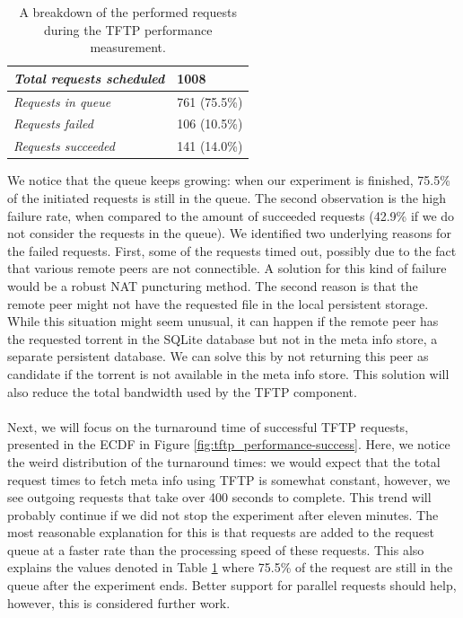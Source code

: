 \begin{table}[h!]
	\centering
	\begin{tabular}{|l|l|}
		\hline
		\emph{Total requests scheduled} & 1008 \\ \hline
		\emph{Requests in queue} & 761 (75.5\%)\\ \hline
		\emph{Requests failed} & 106 (10.5\%)\\ \hline
		\emph{Requests succeeded} & 141 (14.0\%)\\ \hline
	\end{tabular}
	\caption{A breakdown of the performed requests during the TFTP performance measurement.}
	\label{table:tftp-performance}
\end{table}

We notice that the queue keeps growing: when our experiment is finished, 75.5\% of the initiated requests is still in the queue. The second observation is the high failure rate, when compared to the amount of succeeded requests (42.9\% if we do not consider the requests in the queue). We identified two underlying reasons for the failed requests. First, some of the requests timed out, possibly due to the fact that various remote peers are not connectible. A solution for this kind of failure would be a robust NAT puncturing method. The second reason is that the remote peer might not have the requested file in the local persistent storage. While this situation might seem unusual, it can happen if the remote peer has the requested torrent in the SQLite database but not in the meta info store, a separate persistent database. We can solve this by not returning this peer as candidate if the torrent is not available in the meta info store. This solution will also reduce the total bandwidth used by the TFTP component.\\\\
Next, we will focus on the turnaround time of successful TFTP requests, presented in the ECDF in Figure \ref{fig:tftp_performance-success}. Here, we notice the weird distribution of the turnaround times: we would expect that the total request times to fetch meta info using TFTP is somewhat constant, however, we see outgoing requests that take over 400 seconds to complete. This trend will probably continue if we did not stop the experiment after eleven minutes. The most reasonable explanation for this is that requests are added to the request queue at a faster rate than the processing speed of these requests. This also explains the values denoted in Table \ref{table:tftp-performance} where 75.5\% of the request are still in the queue after the experiment ends. Better support for parallel requests should help, however, this is considered further work.

